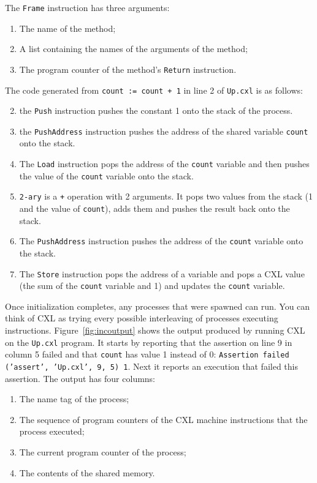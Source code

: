 \documentclass{report}
\begin{document}
The \texttt{Frame} instruction has three arguments:
\begin{enumerate}
\item The name of the method;
\item A list containing the names of the arguments of the method;
\item The program counter of the method's \texttt{Return} instruction.
\end{enumerate}

The code generated from \texttt{count := count + 1} in line 2 of
\texttt{Up.cxl} is as follows:

\begin{enumerate} \setcounter{enumi}{1}
\item the \texttt{Push} instruction pushes the constant 1
onto the stack of the process.
\item the \texttt{PushAddress} instruction pushes the address of
the shared variable \texttt{count} onto the stack.
\item The \texttt{Load} instruction pops the address of the
\texttt{count} variable and then pushes the value of the
\texttt{count} variable onto the stack.
\item \texttt{2-ary} is a \texttt{+} operation with 2 arguments.
It pops two values from the stack (1 and the value of \texttt{count}),
adds them and pushes the result back onto the stack.
\item The \texttt{PushAddress} instruction pushes the address of the \texttt{count}
variable onto the stack.
\item The \texttt{Store} instruction pops the address of a variable and pops
a CXL value (the sum of the \texttt{count} variable and 1) and updates the
\texttt{count} variable.
\end{enumerate}

Once initialization completes, any processes that were spawned can run.
You can think of CXL as trying every possible interleaving of processes executing
instructions.
Figure~\ref{fig:incoutput} shows the output produced by running CXL on the
\texttt{Up.cxl} program.
It starts by reporting that the assertion on line 9 in column 5 failed and that
\texttt{count} has value 1 instead of 0:
\texttt{Assertion failed (’assert’, ’Up.cxl’, 9, 5) 1}.
Next it reports an execution that failed this assertion.  The output has
four columns:
\begin{enumerate}
\item The name tag of the process;
\item The sequence of program counters of the CXL machine instructions that the process executed;
\item The current program counter of the process;
\item The contents of the shared memory.
\end{enumerate}
\end{document}
